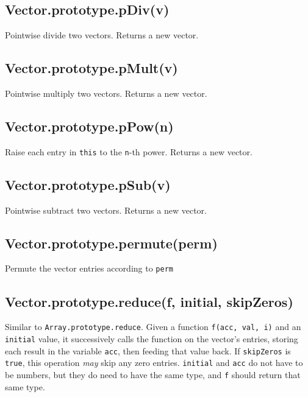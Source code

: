 \documentclass{article}
\begin{document}
    \subsection*{Vector.prototype.pDiv(v)}
    Pointwise divide two vectors. Returns a new vector.


    \subsection*{Vector.prototype.pMult(v)}
    Pointwise multiply two vectors. Returns a new vector.


    \subsection*{Vector.prototype.pPow(n)}
    Raise each entry in \texttt{this} to the \texttt{n}-th power. Returns a new vector.


    \subsection*{Vector.prototype.pSub(v)}
    Pointwise subtract two vectors. Returns a new vector.


    \subsection*{Vector.prototype.permute(perm)}
    Permute the vector entries according to \texttt{perm}


    \subsection*{Vector.prototype.reduce(f, initial, skipZeros)}
    Similar to \texttt{Array.prototype.reduce}. Given a function \texttt{f(acc, val, i)} and an
\texttt{initial} value, it successively calls the function on the vector's entries,
storing each result in the variable \texttt{acc}, then feeding that value back.
If \texttt{skipZeros} is \texttt{true}, this operation \emph{may} skip any zero entries.
\texttt{initial} and \texttt{acc} do not have to be numbers, but they do need to have the
same type, and \texttt{f} should return that same type.
\end{document}
